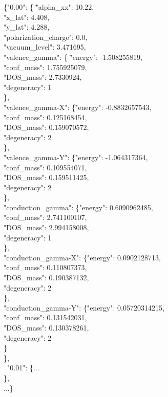 \documentclass[a4paper,12pt]{article}
\begin{document}
\begin{tabbing}
\{"0.00": \{ \= "alpha\_xx": 10.22,\\
	\> "x\_lat": 4.408,\\
	\> "y\_lat": 4.288,\\
	\> "polarization\_charge": 0.0,\\
	\> "vacuum\_level": 3.471695,\\
	\> "valence\_gamma": \{ \="energy": -1.508255819,\\
			     \>\>"conf\_mass": 1.755925079,\\
			     \>\>"DOS\_mass": 2.7330924,\\
			     \>\>"degeneracy": 1\\
			     \>\>\},\\
	   \>"valence\_gamma-X": \{\="energy": -0.8832657543,\\
			      \>\> "conf\_mass": 0.125168454,\\
			      \> \>"DOS\_mass": 0.159070572,\\
			       \>\>"degeneracy": 2\\
			      \>\> \},\\
	   \>"valence\_gamma-Y": \{\="energy": -1.064317364,\\
			      \>\> "conf\_mass": 0.109554071,\\
			      \>\> "DOS\_mass": 0.159511425,\\
			      \>\> "degeneracy": 2\\
			      \>\>\},\\
	   \>"conduction\_gamma": \{\="energy": 0.6090962485,\\
				\>\>"conf\_mass": 2.741100107,\\
				\>\>"DOS\_mass": 2.994158008,\\
			        \>\>"degeneracy": 1\\
			       \>\>\},\\
	  \> "conduction\_gamma-X": \{\="energy": 0.0902128713,\\
				\>\>  "conf\_mass": 0.110807373,\\
				\>\>  "DOS\_mass": 0.190387132,\\
			        \>\>  "degeneracy": 2\\
				\>\> \},\\
	   \>"conduction\_gamma-Y": \{\="energy": 0.05720314215,\\
				\>\>  "conf\_mass": 0.131542031,\\
				  \>\>"DOS\_mass": 0.130378261,\\
			          \>\>"degeneracy": 2\\
				 \>\>\}\\
	 \>\},\\
\ "0.01": \{\=...\\
	  \>\},\\
...\}\\
\end{tabbing}
\end{document}
